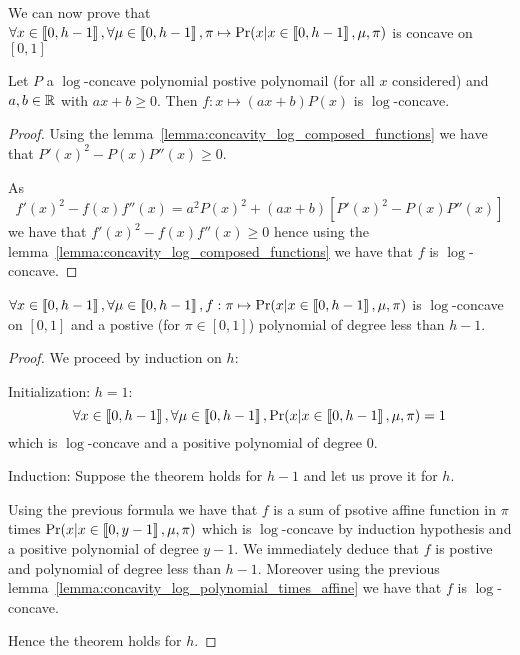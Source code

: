 We can now prove that $\forall x \in \left\llbracket0, h - 1\right\rrbracket, \forall \mu \in \left\llbracket0, h - 1\right\rrbracket, \pi \mapsto \Pr(x | x \in \left\llbracket0, h - 1\right\rrbracket, \mu, \pi)$ is concave on $[0, 1]$


\begin{lemma}
    \label{lemma:concavity_log_polynomial_times_affine}
    Let $P$ a $\log$-concave polynomial postive polynomail (for all $x$ considered) and $a, b \in \mathbb{R}$ with $ax + b \geq 0$. Then $f: x \mapsto (ax + b)P(x)$ is $\log$-concave.
\end{lemma}
\begin{proof}
    Using the lemma~\ref{lemma:concavity_log_composed_functions} we have that $P'(x)^2 - P(x)P''(x) \geq 0$.
    
    As
    \[f'(x)^2 - f(x) f''(x) = a^2 P(x)^2 + (ax + b) \left[ P'(x)^2 - P(x)P''(x) \right] \] 
    we have that $f'(x)^2 - f(x) f''(x) \geq 0$ hence using the lemma~\ref{lemma:concavity_log_composed_functions} we have that $f$ is $\log$-concave.
\end{proof}


\begin{thm}
    $\forall x \in \left\llbracket0, h - 1\right\rrbracket, \forall \mu \in \left\llbracket0, h - 1\right\rrbracket, f: \pi \mapsto \Pr(x | x \in \left\llbracket0, h - 1\right\rrbracket, \mu, \pi)$ is $\log$-concave on $[0, 1]$ and a postive (for $\pi \in [0, 1]$) polynomial of degree less than $h - 1$.
\end{thm}
\begin{proof}
    We proceed by induction on $h$:

    Initialization: $h = 1$: 
    \[ \forall x \in \left\llbracket0, h - 1\right\rrbracket, \forall \mu \in \left\llbracket0, h - 1\right\rrbracket, \Pr(x | x \in \left\llbracket0, h - 1\right\rrbracket, \mu, \pi) = 1\] which is $\log$-concave and a positive polynomial of degree $0$.

    Induction: Suppose the theorem holds for $h - 1$ and let us prove it for $h$.

    Using the previous formula we have that $f$ is a sum of psotive affine function in $\pi$ times $\Pr(x | x \in \left\llbracket0, y - 1\right\rrbracket, \mu, \pi)$ which is $\log$-concave by induction hypothesis and a positive polynomial of degree $y - 1$. We immediately deduce that $f$ is postive and polynomial of degree less than $h - 1$. Moreover using the previous lemma~\ref{lemma:concavity_log_polynomial_times_affine} we have that $f$ is $\log$-concave.

    Hence the theorem holds for $h$.
\end{proof}
